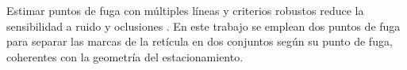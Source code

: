 Estimar puntos de fuga con múltiples líneas y criterios robustos reduce la sensibilidad a ruido y oclusiones
\cite{hartley2003multiple,kanatani1998statistical}. En este trabajo se emplean dos puntos de fuga para separar
las marcas de la retícula en dos conjuntos según su punto de fuga, coherentes con la geometría del estacionamiento.
